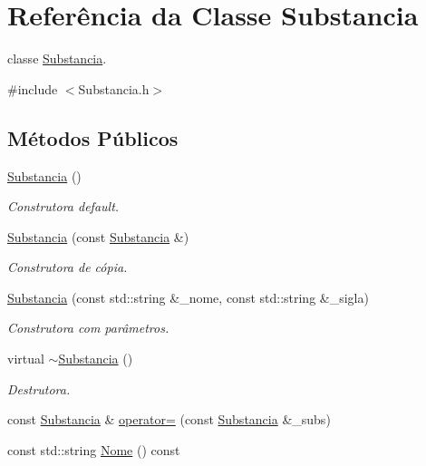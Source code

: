 \hypertarget{class_substancia}{\section{Referência da Classe Substancia}
\label{class_substancia}
}


classe \hyperlink{class_substancia}{Substancia}.  




{\ttfamily \#include $<$Substancia.\+h$>$}

\subsection*{Métodos Públicos}
\begin{DoxyCompactItemize}
\item 
\hypertarget{class_substancia_a56aa34f9dbe73ccab16039436b1505d4}{\hyperlink{class_substancia_a56aa34f9dbe73ccab16039436b1505d4}{Substancia} ()}\label{class_substancia_a56aa34f9dbe73ccab16039436b1505d4}

\begin{DoxyCompactList}\small\item\em Construtora default. \end{DoxyCompactList}\item 
\hypertarget{class_substancia_aba4e86781ad56ba4684ed49a31537173}{\hyperlink{class_substancia_aba4e86781ad56ba4684ed49a31537173}{Substancia} (const \hyperlink{class_substancia}{Substancia} \&)}\label{class_substancia_aba4e86781ad56ba4684ed49a31537173}

\begin{DoxyCompactList}\small\item\em Construtora de cópia. \end{DoxyCompactList}\item 
\hyperlink{class_substancia_a113fbf9f901acd1922d4492bffdb4c92}{Substancia} (const std\+::string \&\+\_\+nome, const std\+::string \&\+\_\+sigla)
\begin{DoxyCompactList}\small\item\em Construtora com parâmetros. \end{DoxyCompactList}\item 
\hypertarget{class_substancia_a94be07bd679da6a7400cb392d3bb73a8}{virtual \hyperlink{class_substancia_a94be07bd679da6a7400cb392d3bb73a8}{$\sim$\+Substancia} ()}\label{class_substancia_a94be07bd679da6a7400cb392d3bb73a8}

\begin{DoxyCompactList}\small\item\em Destrutora. \end{DoxyCompactList}\item 
const \hyperlink{class_substancia}{Substancia} \& \hyperlink{class_substancia_add6ff47233bc129b1036f38529e40864}{operator=} (const \hyperlink{class_substancia}{Substancia} \&\+\_\+subs)
\item 
\hypertarget{class_substancia_a5ea6f06f2ace2d9a6c54498d30c3036b}{const std\+::string \hyperlink{class_substancia_a5ea6f06f2ace2d9a6c54498d30c3036b}{Nome} () const }\label{class_substancia_a5ea6f06f2ace2d9a6c54498d30c3036b}


\end{DoxyCompactItemize}
